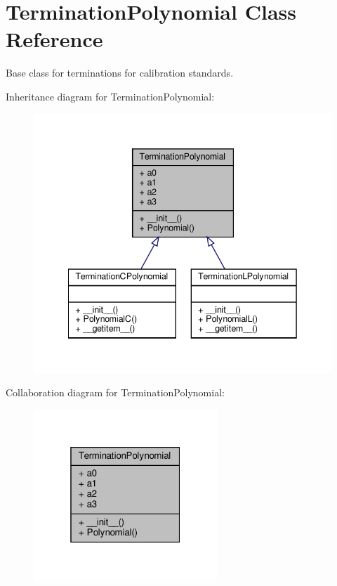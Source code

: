 \hypertarget{classSignalIntegrity_1_1Measurement_1_1CalKit_1_1Standards_1_1TerminationPolynomial_1_1TerminationPolynomial}{}\section{Termination\+Polynomial Class Reference}
\label{classSignalIntegrity_1_1Measurement_1_1CalKit_1_1Standards_1_1TerminationPolynomial_1_1TerminationPolynomial}


Base class for terminations for calibration standards.  




Inheritance diagram for Termination\+Polynomial\+:\nopagebreak
\begin{figure}[H]
\begin{center}
\leavevmode
\includegraphics[width=342pt]{classSignalIntegrity_1_1Measurement_1_1CalKit_1_1Standards_1_1TerminationPolynomial_1_1TerminationPolynomial__inherit__graph}
\end{center}
\end{figure}


Collaboration diagram for Termination\+Polynomial\+:\nopagebreak
\begin{figure}[H]
\begin{center}
\leavevmode
\includegraphics[width=196pt]{classSignalIntegrity_1_1Measurement_1_1CalKit_1_1Standards_1_1TerminationPolynomial_1_1TerminationPolynomial__coll__graph}
\end{center}
\end{figure}

